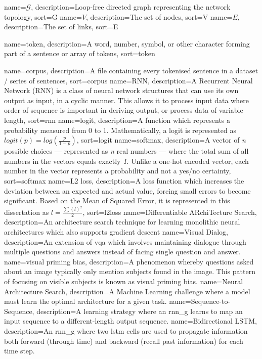 {
    name=\(\mathcal{G}\),
    description={Loop-free directed graph representing the network topology},
    sort=G
}
{
    name=\(V\),
    description={The set of nodes},
    sort=V
}
{
    name=\(E\),
    description={The set of links},
    sort=E
}

{
    name=token,
    description={A word, number, symbol, or other character forming part of a sentence or array of tokens},
    sort=token
}

{
    name=corpus,
    description={A file containing every tokenised sentence in a dataset / series of sentences},
    sort=corpus
}
{
    name={RNN},
    description={A Recurrent Neural Network (RNN) is a class of neural network structures that
    can use its own output as input, in a cyclic manner. This allows it to process input data where order of sequence is important in deriving output, or process data of variable length},
    sort=rnn
}
{
    name={logit},
    description={A function which represents a probability measured from 0 to 1. Mathematically, a logit is represented as \(logit(p)=log(\frac{p}{1-p})\)},
    sort=logit
}
{
    name={softmax},
    description={A vector of \textit{n} possible choices --- represented as \textit{n} real numbers --- where the total sum of all numbers in the vectors equals exactly \textit{1}. Unlike a one-hot encoded vector, each number in the vector represents a probability and not a yes/no certainty},
    sort=softmax
}
{
    name={L2 loss},
    description={A loss function which increases the deviation between an expected and actual value, forcing small errors to become significant. Based on the Mean of Squared Error, it is represented in this dissertation as \(l=\frac{\sum(l)^2}{2}\)},
    sort=l2loss
}
{
    name={Differentiable ARchiTecture Search},
    description={An architecture search technique for learning monolithic neural architectures which also supports gradient descent}
}
{
    name={Visual Dialog},
    description={An extension of \gls{vqa} which involves maintaining dialogue through multiple questions and answers instead of facing single question and answer. }
}
{
    name={visual priming bias},
    description={A phenomenon whereby questions asked about an image typically only mention subjects found in the image. This pattern of focusing on visible subjects is known as visual priming bias.}
}
{
    name={Neural Architecture Search},
    description={A Machine Learning challenge where a model must learn the optimal architecture for a given task.}
}
{
    name={Sequence-to-Sequence},
    description={A learning strategy where an \gls{rnn_g} learns to map an input sequence to a different-length output sequence.}
}
{
    name={Bidirectional LSTM},
    description={An \gls{rnn_g} where two \gls{lstm} cells are used to propagate information both forward (through time) and backward (recall past information) for each time step.}
}